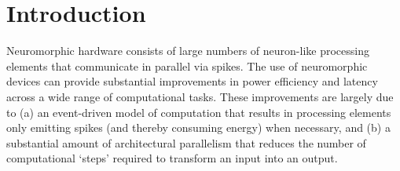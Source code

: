 \documentclass[sigconf, screen]{acmart}
\begin{document}


%

\maketitle

\section{Introduction}

Neuromorphic hardware consists of large numbers of neuron-like processing elements that communicate in parallel via spikes. The use of neuromorphic devices can provide substantial improvements in power efficiency and latency across a wide range of computational tasks. These improvements are largely due to (a) an event-driven model of computation that results in processing elements only emitting spikes (and thereby consuming energy) when necessary, and (b) a substantial amount of architectural parallelism that reduces the number of computational `steps' required to transform an input into an output. 
\end{document}
